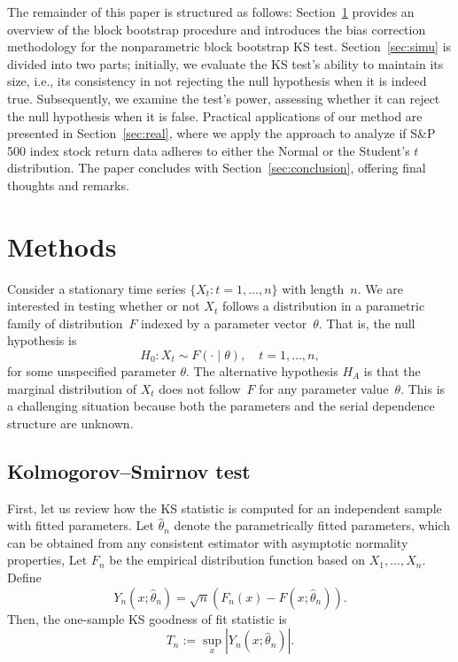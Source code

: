 \documentclass[APA,Times1COL]{WileyNJDv5} %
\begin{document}
The remainder of this paper is structured as follows: 
Section~\ref{sec:methods} provides an overview of the block bootstrap 
procedure and introduces the bias correction methodology for the 
nonparametric block bootstrap KS test. Section~\ref{sec:simu} is divided 
into two parts; initially, we evaluate the KS test's ability to maintain 
its size, i.e., its consistency in not rejecting the null hypothesis when 
it is indeed true. Subsequently, we examine the test's power, assessing 
whether it can reject the null hypothesis when it is false. Practical 
applications of our method are presented in Section~\ref{sec:real}, where 
we apply the approach to analyze if S\&P 500 index stock return
data adheres to either the Normal or the Student's $t$ distribution. The 
paper concludes with Section~\ref{sec:conclusion}, offering final thoughts
and remarks.


\section{Methods}\label{sec:methods}

Consider a stationary time series $\{X_t: t = 1, \ldots, n\}$ with length~$n$.
We are interested in testing whether or not $X_t$ follows a distribution in a
parametric family of distribution~$F$ indexed by a parameter
vector~$\theta$. That is, the null hypothesis is
\[
  H_0: X_t \sim F(\cdot \mid \theta), \quad t = 1, \ldots, n,
\]
for some unspecified parameter $\theta$.
The alternative hypothesis $H_A$ is that the marginal distribution of $X_t$ does
not follow~$F$ for any parameter value~$\theta$. This is a challenging situation
because both the parameters and the serial dependence structure are unknown.

\subsection{Kolmogorov--Smirnov test}

First, let us review how the KS statistic is computed for an independent
sample with fitted parameters. Let $\hat\theta_n$ denote the parametrically
fitted parameters, which can be obtained from any consistent estimator with
asymptotic normality properties,  Let $F_n$ be the empirical distribution
function based on $X_1,...,X_n$.
Define 
\begin{equation*}
Y_n(x; \hat\theta_n) = \sqrt{n}(F_n(x) - F(x; \hat\theta_n)).
\end{equation*}
Then, the one-sample KS goodness of fit statistic is 
\begin{equation*}
T_n := \sup_x|Y_n(x; \hat\theta_n)|.
\end{equation*}
\end{document}
